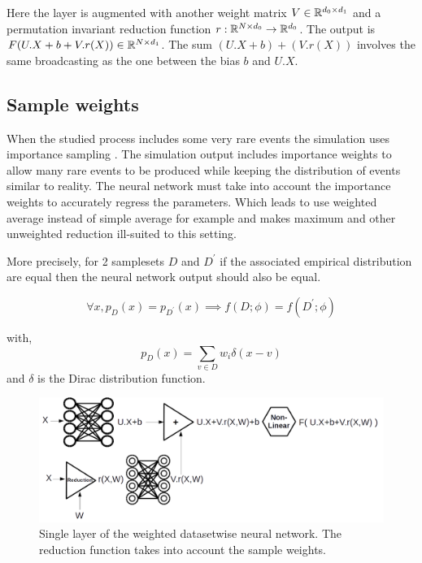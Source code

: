 Here the layer is augmented with another weight matrix $V  \in \mathbb{R}^{d_0\times d_1}$ and a permutation invariant reduction function $r : \mathbb{R}^{N \times d_0} \to \mathbb{R}^{d_0}$.
The output is $ F(U.X+b+V.r(X)) \in \mathbb{R}^{N \times d_1}$.
The sum $(U.X+b) + (V.r(X))$ involves the same broadcasting as the one between the bias $b$ and $U.X$.








\subsection{Sample weights} %
\label{sub:sample_weights}


When the studied process includes some very rare events the simulation uses importance sampling \needcite. 
The simulation output includes importance weights to allow many rare events to be produced while keeping the distribution of events similar to reality.
The neural network must take into account the importance weights to accurately regress the parameters.
Which leads to use weighted average instead of simple average for example and makes maximum and other unweighted reduction ill-suited to this setting.

More precisely, for 2 samplesets $D$ and $D^\prime$ if the associated empirical distribution are equal then the neural network output should also be equal.

\begin{equation}
    \forall x, p_D(x) = p_{D^\prime}(x) \implies f(D; \phi) = f(D^\prime; \phi)
\end{equation}

with,
\begin{equation}
    p_D(x) = \sum_{v \in D} w_i \delta (x - v)
\end{equation}
and $\delta$ is the Dirac distribution function.

\begin{figure}[htb]
    \includegraphics[width=\linewidth]{weighted_average_layer}
    \caption{Single layer of the weighted datasetwise neural network. The reduction function takes into account the sample weights.}
    \label{fig:weighted_average_layer}
\end{figure}








